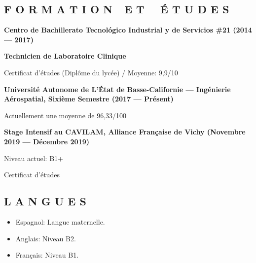 \documentclass[12pt, letterpaper]{article}
\begin{document}
\begin{shaded}
	\vspace{-0.3cm}
	\subsection*{\textcolor{title}{F O R M A T I O N\ \ E T \ \ É T U D E S}}

	\textbf{\textcolor{subtitle}{Centro de Bachillerato Tecnológico Industrial y de Servicios \#21 (2014 --- 2017)}}
	
	\textbf{Technicien de Laboratoire Clinique}

	Certificat d'études (Diplôme du lycée) / Moyenne: 9,9/10

	\noindent \textbf{\textcolor{subtitle}{Université Autonome de L'État de  Basse-Californie --- Ingénierie Aérospatial, Sixième Semestre (2017 --- Présent)}}

	Actuellement une moyenne de 96,33/100

	\noindent \textbf{\textcolor{subtitle}{Stage Intensif au CAVILAM, Alliance Française de Vichy (Novembre 2019 --- Décembre 2019)}}

	Niveau actuel: B1+

	Certificat d'études

\end{shaded}


\subsection*{\textcolor{title}{L A N G U E S}}

\begin{itemize}
	\item Espagnol: Langue maternelle.
	\item Anglais: Niveau B2.
	\item Français: Niveau B1.
\end{itemize}
\end{document}
